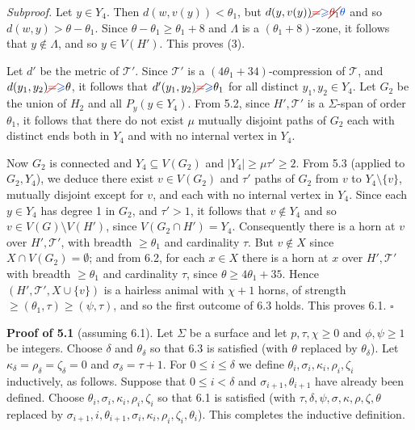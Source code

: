 \textit{Subproof.} Let $y \in Y_4$. Then $d(w, v(y)) < \theta_1$, but $d(y, v(y)) \delm{=}\fix{\ge} \delm{\theta_1}\fix{\theta}$ and so $d(w, y) > \theta - \theta_1$. Since $\theta - \theta_1 \ge \theta_1 + 8$ and $\Lambda$ is a $(\theta_1 + 8)$-zone, it follows that $y \notin \Lambda$, and so $y \in V(H')$. This proves (3).

Let $d'$ be the metric of $\mathcal{T}'$. Since $\mathcal{T}'$ is a $(4\theta_1 + 34)$-compression of $\mathcal{T}$, and $d(y_1, y_2) \delm{=}\fix{\ge} \theta$, it follows that $d'(y_1, y_2) \delm{=}\fix{\ge} \theta_1$ for all distinct $y_1, y_2 \in Y_4$. Let $G_2$ be the union of $H_2$ and all $P_y(y \in Y_4)$. From 5.2, since $H', \mathcal{T}'$ is a $\Sigma$-span of order $\theta_1$, it follows that there do not exist $\mu$ mutually disjoint paths of $G_2$ each with distinct ends both in $Y_4$ and with no internal vertex in $Y_4$.

Now $G_2$ is connected and $Y_4 \subseteq V(G_2)$ and $|Y_4| \ge \mu\tau' \ge 2$. From 5.3 (applied to $G_2, Y_4$), we deduce there exist $v \in V(G_2)$ and $\tau'$ paths of $G_2$ from $v$ to $Y_4 \setminus \{v\}$, mutually disjoint except for $v$, and each with no internal vertex in $Y_4$. Since each $y \in Y_4$ has degree 1 in $G_2$, and $\tau' > 1$, it follows that $v \notin Y_4$ and so $v \in V(G)\setminus V(H')$, since $V(G_2 \cap H') = Y_4$. Consequently there is a horn at $v$ over $H', \mathcal{T}'$, with breadth $\ge \theta_1$ and cardinality $\tau$. But $v \notin X$ since $X \cap V(G_2) = \emptyset$; and from 6.2, for each $x \in X$ there is a horn at $x$ over $H', \mathcal{T}'$ with breadth $\ge \theta_1$ and cardinality $\tau$, since $\theta \ge 4\theta_1 + 35$. Hence $(H', \mathcal{T}', X \cup \{v\})$ is a hairless animal with $\chi + 1$ horns, of strength $\ge (\theta_1, \tau) \ge (\psi, \tau)$, and so the first outcome of 6.3 holds. This proves 6.1. $\square$

\textbf{Proof of 5.1} (assuming 6.1). Let $\Sigma$ be a surface and let $p, \tau, \chi \ge 0$ and $\phi, \psi \ge 1$ be integers. Choose $\delta$ and $\theta_\delta$ so that 6.3 is satisfied (with $\theta$ replaced by $\theta_\delta$). Let $\kappa_\delta = \rho_\delta = \zeta_\delta = 0$ and $\sigma_\delta = \tau + 1$. For $0 \le i \le \delta$ we define $\theta_i, \sigma_i, \kappa_i, \rho_i, \zeta_i$ inductively, as follows. Suppose that $0 \le i < \delta$ and $\sigma_{i+1}, \theta_{i+1}$ have already been defined. Choose $\theta_i, \sigma_i, \kappa_i, \rho_i, \zeta_i$ so that 6.1 is satisfied (with $\tau, \delta, \psi, \sigma, \kappa, \rho, \zeta, \theta$ replaced by $\sigma_{i+1}, i, \theta_{i+1}, \sigma_i, \kappa_i, \rho_i, \zeta_i, \theta_i$). This completes the inductive definition.

